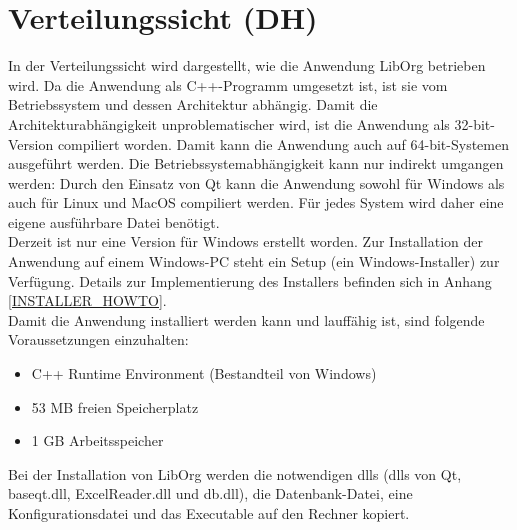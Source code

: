 \section{Verteilungssicht (DH)}
In der Verteilungssicht wird dargestellt, wie die Anwendung LibOrg betrieben wird. Da die Anwendung als C++-Programm umgesetzt ist, ist sie vom Betriebssystem und dessen Architektur abhängig. Damit die Architekturabhängigkeit unproblematischer wird, ist die Anwendung als 32-bit-Version compiliert worden. Damit kann die Anwendung auch auf 64-bit-Systemen ausgeführt werden. Die Betriebssystemabhängigkeit kann nur indirekt umgangen werden: Durch den Einsatz von Qt kann die Anwendung sowohl für Windows als auch für Linux und MacOS compiliert werden. Für jedes System wird daher eine eigene ausführbare Datei benötigt.\bigskip \\
Derzeit ist nur eine Version für Windows erstellt worden. Zur Installation der Anwendung auf einem Windows-PC steht ein Setup (ein Windows-Installer) zur Verfügung. Details zur Implementierung des Installers befinden sich in Anhang \ref{INSTALLER_HOWTO}.\bigskip \\
Damit die Anwendung installiert werden kann und lauffähig ist, sind folgende Voraussetzungen einzuhalten:
\begin{itemize}
	\item C++ Runtime Environment (Bestandteil von Windows)
	\item 53 MB freien Speicherplatz
	\item 1 GB Arbeitsspeicher
\end{itemize}
Bei der Installation von LibOrg werden die notwendigen dlls (dlls von Qt, baseqt.dll, ExcelReader.dll und db.dll), die Datenbank-Datei, eine Konfigurationsdatei und das Executable auf den Rechner kopiert. 
